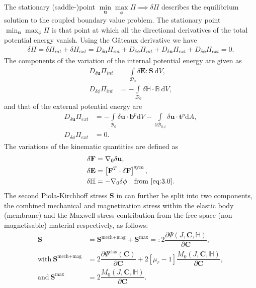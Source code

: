 The stationary (saddle-)point $\min\limits_{\mathbf{u}} \max\limits_{\phi} \Pi \implies \delta \Pi$ describes the equilibrium solution to the coupled boundary value problem. The stationary point $\min_{\mathbf{u}} \max_{\phi} \Pi$ is that point at which all the directional derivatives of the total potential energy vanish. Using the G\^ateaux derivative we have
\begin{align}
\delta \Pi = \delta \Pi_{int} + \delta \Pi_{ext} = D_{\delta \mathbf{u}} \Pi_{int} + D_{\delta \phi} \Pi_{int} + D_{\delta \mathbf{u}} \Pi_{ext} + D_{\delta \phi} \Pi_{ext} = 0. \label{eq:3.25} 
\end{align}
The components of the variation of the internal potential energy are given as \cite{Saxena2015}
\begin{align}
D_{\delta \mathbf{u}} \Pi_{int} &= \int\limits_{\mathcal{D}_0} \delta \mathbf{E} : \mathbf{S} \ \mathrm{d}V, \label{eq:3.26.1}\\
D_{\delta \phi} \Pi_{int} &= -\int\limits_{\mathcal{D}_0} \delta \mathbb{H} \cdot \mathbb{B} \ \mathrm{d}V,
\label{eq:3.26.2}
\end{align}
and that of the external potential energy are
\begin{align}
D_{\delta \mathbf{u}} \Pi_{ext} &= -\int\limits_{\mathcal{B}_0} \delta \mathbf{u} \cdot \mathbf{b}^p \mathrm{d}V - \int\limits_{\partial \mathcal{B}_{0,t}} \delta \mathbf{u} \cdot \mathbf{t}^p \mathrm{d}A, \label{eq:3.27.1}\\
D_{\delta \phi} \Pi_{ext} &= 0.
\label{eq:3.27.2}
\end{align}
The variations of the kinematic quantities are defined as 
\begin{align}
\delta \mathbf{F} &= \nabla_0 \delta \mathbf{u}, \\
\delta \mathbf{E} &= \left[ \mathbf{F}^T \cdot \delta \mathbf{F} \right]^{\text{sym}}, \\ 
\delta \mathbb{H} &= -\nabla_0 \delta \phi \ \ \text{ from \Cref{eq:3.0}}.
\label{eq:3.28}
\end{align}
The second Piola-Kirchhoff stress $\mathbf{S}$ in  can further be split into two components, the combined mechanical and magnetization stress within the elastic body (membrane) and the Maxwell stress contribution from the free space (non-magnetisable) material respectively, as follows:
\begin{align}
\mathbf{S} &= \mathbf{S}^{\text{mech}+\text{mag}} + \mathbf{S}^{\text{max}} =: 2 \dfrac{\partial \Psi (J, \mathbf{C}, \mathbb{H})}{\partial \mathbf{C}}, \\
\text{with} \ \mathbf{S}^{\text{mech}+\text{mag}} &= 2 \dfrac{\partial \Psi^{\text{elas}} (\mathbf{C})}{\partial \mathbf{C}} + 2 \left[ \mu_r - 1 \right] \dfrac{M_0 (J, \mathbf{C}, \mathbb{H})}{\partial \mathbf{C}}, \\
\text{and} \ \mathbf{S}^{\text{max}} &= 2 \dfrac{M_0 (J, \mathbf{C}, \mathbb{H})}{\partial \mathbf{C}}.
\end{align}
